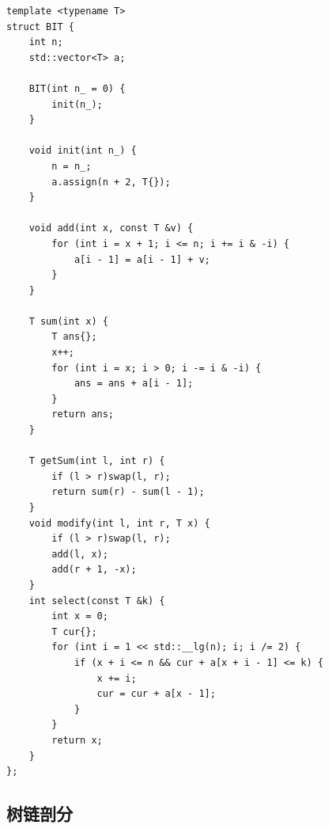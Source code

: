 \documentclass[a4paper,10pt]{article}
\begin{document}
\noindent\begin{lstlisting}
template <typename T>
struct BIT {
    int n;
    std::vector<T> a;

    BIT(int n_ = 0) {
        init(n_);
    }

    void init(int n_) {
        n = n_;
        a.assign(n + 2, T{});
    }

    void add(int x, const T &v) {
        for (int i = x + 1; i <= n; i += i & -i) {
            a[i - 1] = a[i - 1] + v;
        }
    }

    T sum(int x) {
        T ans{};
        x++;
        for (int i = x; i > 0; i -= i & -i) {
            ans = ans + a[i - 1];
        }
        return ans;
    }

    T getSum(int l, int r) {
        if (l > r)swap(l, r);
        return sum(r) - sum(l - 1);
    }
    void modify(int l, int r, T x) {
        if (l > r)swap(l, r);
        add(l, x);
        add(r + 1, -x);
    }
    int select(const T &k) {
        int x = 0;
        T cur{};
        for (int i = 1 << std::__lg(n); i; i /= 2) {
            if (x + i <= n && cur + a[x + i - 1] <= k) {
                x += i;
                cur = cur + a[x - 1];
            }
        }
        return x;
    }
};\end{lstlisting}

\subsection{树链剖分}
\thispagestyle{fancy}
\end{document}
